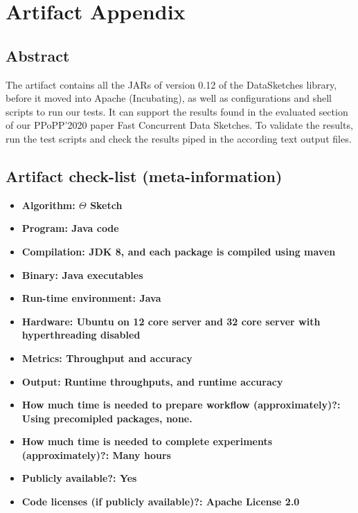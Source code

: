 
\section{Artifact Appendix}

\subsection{Abstract}

The artifact contains all the JARs of version 0.12 of the DataSketches
library, before it moved into Apache (Incubating), as well as configurations
and shell scripts to run our tests. It can support the results found in
the evaluated section of our PPoPP'2020 paper Fast Concurrent Data Sketches. To
validate the results, run the test scripts and check the results piped
in the according text output files.

\subsection{Artifact check-list (meta-information)}

\small
\begin{itemize}
  \item {\bf Algorithm: $\Theta$ Sketch}
  \item {\bf Program: Java code}
  \item {\bf Compilation: JDK 8, and each package is compiled using maven}
  \item {\bf Binary: Java executables}
  \item {\bf Run-time environment: Java}
  \item {\bf Hardware: Ubuntu on 12 core server and 32 core server with hyperthreading disabled}
  \item {\bf Metrics: Throughput and accuracy}
  \item {\bf Output: Runtime throughputs, and runtime accuracy}
  \item {\bf How much time is needed to prepare workflow (approximately)?: Using precomipled packages, none.}
  \item {\bf How much time is needed to complete experiments (approximately)?: Many hours}
  \item {\bf Publicly available?: Yes}
  \item {\bf Code licenses (if publicly available)?: Apache License 2.0}
\end{itemize}

